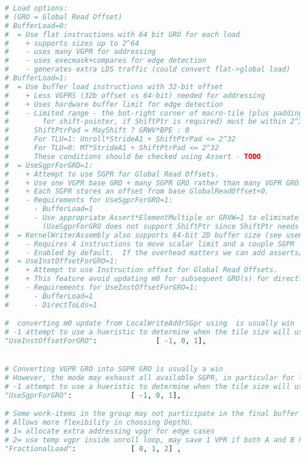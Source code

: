 \documentclass[]{article}
\begin{document}
\begin{lstlisting}[language=python,breaklines=true]
# Load options:
# (GRO = Global Read Offset)
# BufferLoad=0:
#  = Use flat instructions with 64 bit GRO for each load
#    + supports sizes up to 2^64
#    - uses many VGPR for addressing
#    - uses execmask+compares for edge detection
#    - generates extra LDS traffic (could convert flat->global load)
# BufferLoad=1:
#  = Use buffer load instructions with 32-bit offset
#    + Less VGPRS (32b offset vs 64-bit) needed for addressing
#    + Uses hardware buffer limit for edge detection
#    - Limited range - the bot-right corner of macro-tile (plus padding=GRVW
#        for shift-pointer, if ShiftPtr is required) must be within 2^32.
#      ShiftPtrPad = MayShift ? GRWV*BPE : 0
#      For TLU=1: Unroll*StrideA1 + ShiftPtrPad <= 2^32
#      For TLU=0: MT*StrideA1 + ShiftPtrPad <= 2^32
#      These conditions should be checked using Assert - TODO
#  = UseSgprForGRO=1:
#    + Attempt to use SGPR for Global Read Offsets.
#    + Use one VGPR base GRO + many SGPR GRO rather than many VGPR GRO.
#    + Each SGPR stores an offset from base GlobalReadOffset+0.
#    - Requirements for UseSgprForGRO=1:
#      - BufferLoad=1
#      - Use appropriate Assert*ElementMultiple or GRVW=1 to eliminate need for ShifPtr
#        (UseSgprForGRO does not support ShiftPtr since ShiftPtr needs to potentially shift GRO)
#  = KernelWriterAssembly also supports 64-bit 2D buffer size (see use64bPbcLimit)
#    - Requires 4 instructions to move scalar limit and a couple SGPR
#    - Enabled by default.  If the overhead matters we can add asserts/YAML parm to specialize
#  = UseInstOffsetForGRO=1:
#    + Attempt to use Instruction offset for Global Read Offsets.
#    + This feature avoid updating m0 for subsequent GRO(s) for directToLds feature
#    - Requirements for UseInstOffsetForGRO=1:
#      - BufferLoad=1
#      - DirectToLds=1

#  converting m0 update from LocalWriteAddrSGpr using  is usually win
# -1 attempt to use a hueristic to determine when the tile size will use too many SGPR and fall back to VGPR
"UseInstOffsetForGRO":              [ -1, 0, 1],


# Converting VGPR GRO into SGPR GRO is usually a win
# However, the mode may exhaust all available SGPR, in particular for large unroll
# -1 attempt to use a hueristic to determine when the tile size will use too many SGPR and fall back to VGPR
"UseSgprForGRO":              [ -1, 0, 1],

# Some work-items in the group may not participate in the final buffer load.
# Allows more flexibility in choosing DepthU.
# 1= allocate extra addressing vpgr for edge cases
# 2= use temp vgpr inside unroll loop, may save 1 VPR if both A and B have a fractional edge but costs v_alu
"FractionalLoad":             [ 0, 1, 2] ,


\end{lstlisting}
\end{document}
